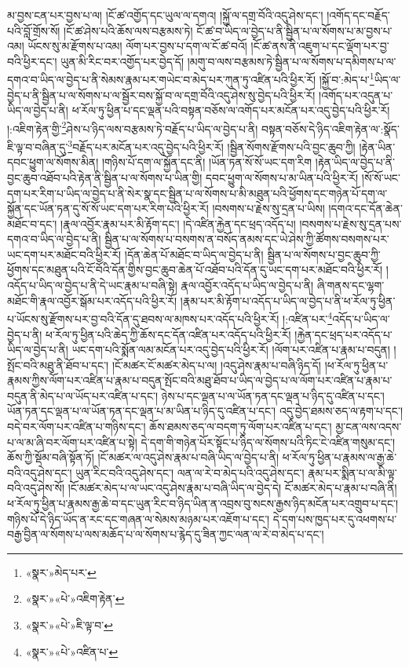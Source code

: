 མ་བྱས་ངན་པར་བྱས་པ་ལ། །ངོ་ཚ་འགྱོད་དང་ཡུལ་ལ་དགའ། །སྐྱོ་ལ་དགྲ་བོའི་འདུ་ཤེས་དང་། །འགོད་དང་བརྗོད་པའི་བློ་གྲོས་སོ། །ངོ་ཚ་ཤེས་པའི་ཆོས་ལས་བརྩམས་ཏེ། ངོ་ཚ་བ་ཡིད་ལ་བྱེད་པ་ནི་སྦྱིན་པ་ལ་སོགས་པ་མ་བྱས་པ་འམ། ཡོངས་སུ་མ་རྫོགས་པ་འམ། ལོག་པར་བྱས་པ་དག་ལ་ངོ་ཚ་བའོ། །ངོ་ཚ་ནས་ནི་འཇུག་པ་དང་ལྡོག་པར་བྱ་བའི་ཕྱིར་དང་། ཡུན་མི་རིང་བར་འགྱོད་པར་བྱེད་དོ། །མགུ་བ་ལས་བརྩམས་ཏེ་སྦྱིན་པ་ལ་སོགས་པ་དམིགས་པ་ལ་དགའ་བ་ཡིད་ལ་བྱེད་པ་ནི་སེམས་རྣམ་པར་གཡེང་བ་མེད་པར་ཀུན་ཏུ་འཛིན་པའི་ཕྱིར་རོ། །སྐྱོ་བ་:མེད་པ་\footnote{«སྣར་»མེད་པར་}ཡིད་ལ་བྱེད་པ་ནི་སྦྱིན་པ་ལ་སོགས་པ་ལ་སྦྱོར་བས་སྐྱོ་བ་ལ་དགྲ་བོའི་འདུ་ཤེས་སུ་བྱེད་པའི་ཕྱིར་རོ། །འགོད་པར་འདུན་པ་ཡིད་ལ་བྱེད་པ་ནི། ཕ་རོལ་ཏུ་ཕྱིན་པ་དང་ལྡན་པའི་བསྟན་བཅོས་ལ་འགོད་པར་མངོན་པར་འདུ་བྱེད་པའི་ཕྱིར་རོ། །:འཇིག་རྟེན་གྱི་\footnote{«སྣར་»«པེ་»འཇིག་རྟེན་}ཤེས་པ་ཉིད་ལས་བརྩམས་ཏེ་བརྗོད་པ་ཡིད་ལ་བྱེད་པ་ནི། བསྟན་བཅོས་དེ་ཉིད་འཇིག་རྟེན་ལ་:སྣོད་ཇི་ལྟ་བ་བཞིན་དུ་\footnote{«སྣར་»«པེ་»ཇི་ལྟ་བ་}བརྗོད་པར་མངོན་པར་འདུ་བྱེད་པའི་ཕྱིར་རོ། །སྦྱིན་སོགས་རྫོགས་པའི་བྱང་ཆུབ་ཀྱི། །རྟེན་ཡིན་དབང་ཕྱུག་ལ་སོགས་མིན། །གཉིས་པོ་དག་ལ་སྐྱོན་དང་ནི། །ཡོན་ཏན་སོ་སོ་ཡང་དག་རིག །རྟེན་ཡིད་ལ་བྱེད་པ་ནི་བྱང་ཆུབ་འཐོབ་པའི་རྟེན་ནི་སྦྱིན་པ་ལ་སོགས་པ་ཡིན་གྱི། དབང་ཕྱུག་ལ་སོགས་པ་མ་ཡིན་པའི་ཕྱིར་རོ། །སོ་སོ་ཡང་དག་པར་རིག་པ་ཡིད་ལ་བྱེད་པ་ནི་སེར་སྣ་དང་སྦྱིན་པ་ལ་སོགས་པ་མི་མཐུན་པའི་ཕྱོགས་དང་གཉེན་པོ་དག་ལ་སྐྱོན་དང་ཡོན་ཏན་དུ་སོ་སོ་ཡང་དག་པར་རིག་པའི་ཕྱིར་རོ། །བསགས་པ་རྗེས་སུ་དྲན་པ་ཡིས། །དགའ་དང་དོན་ཆེན་མཐོང་བ་དང་། །རྣལ་འབྱོར་རྣམ་པར་མི་རྟོག་དང་། །དེ་འཛིན་རྐྱེན་དང་ཕྲད་འདོད་པ། །བསགས་པ་རྗེས་སུ་དྲན་པས་དགའ་བ་ཡིད་ལ་བྱེད་པ་ནི། སྦྱིན་པ་ལ་སོགས་པ་བསགས་ན་བསོད་ནམས་དང་ཡེ་ཤེས་ཀྱི་ཚོགས་བསགས་པར་ཡང་དག་པར་མཐོང་བའི་ཕྱིར་རོ། །དོན་ཆེན་པོ་མཐོང་བ་ཡིད་ལ་བྱེད་པ་ནི། སྦྱིན་པ་ལ་སོགས་པ་བྱང་ཆུབ་ཀྱི་ཕྱོགས་དང་མཐུན་པའི་ངོ་བོའི་དོན་གྱིས་བྱང་ཆུབ་ཆེན་པོ་འཐོབ་པའི་དོན་དུ་ཡང་དག་པར་མཐོང་བའི་ཕྱིར་རོ། །འདོད་པ་ཡིད་ལ་བྱེད་པ་ནི་དེ་ཡང་རྣམ་པ་བཞི་སྟེ། རྣལ་འབྱོར་འདོད་པ་ཡིད་ལ་བྱེད་པ་ནི། ཞི་གནས་དང་ལྷག་མཐོང་གི་རྣལ་འབྱོར་སྒོམ་པར་འདོད་པའི་ཕྱིར་རོ། །རྣམ་པར་མི་རྟོག་པ་འདོད་པ་ཡིད་ལ་བྱེད་པ་ནི་ཕ་རོལ་ཏུ་ཕྱིན་པ་ཡོངས་སུ་རྫོགས་པར་བྱ་བའི་དོན་དུ་ཐབས་ལ་མཁས་པར་འདོད་པའི་ཕྱིར་རོ། །:འཛིན་པར་\footnote{«སྣར་»«པེ་»འཛིན་པ་}འདོད་པ་ཡིད་ལ་བྱེད་པ་ནི། ཕ་རོལ་ཏུ་ཕྱིན་པའི་ཆེད་ཀྱི་ཆོས་དང་དོན་འཛིན་པར་འདོད་པའི་ཕྱིར་རོ། །རྐྱེན་དང་ཕྲད་པར་འདོད་པ་ཡིད་ལ་བྱེད་པ་ནི། ཡང་དག་པའི་སྨོན་ལམ་མངོན་པར་འདུ་བྱེད་པའི་ཕྱིར་རོ། །ལོག་པར་འཛིན་པ་རྣམ་པ་བདུན། །སྤོང་བའི་མཐུ་ནི་ཐོབ་པ་དང་། །ངོ་མཚར་ངོ་མཚར་མེད་པ་ལ། །འདུ་ཤེས་རྣམ་པ་བཞི་ཉིད་དོ། །ཕ་རོལ་ཏུ་ཕྱིན་པ་རྣམས་ཀྱིས་ལོག་པར་འཛིན་པ་རྣམ་པ་བདུན་སྤོང་བའི་མཐུ་ཐོབ་པ་ཡིད་ལ་བྱེད་པ་ལ་ལོག་པར་འཛིན་པ་རྣམ་པ་བདུན་ནི་མེད་པ་ལ་ཡོད་པར་འཛིན་པ་དང་། ཉེས་པ་དང་ལྡན་པ་ལ་ཡོན་ཏན་དང་ལྡན་པ་ཉིད་དུ་འཛིན་པ་དང་། ཡོན་ཏན་དང་ལྡན་པ་ལ་ཡོན་ཏན་དང་ལྡན་པ་མ་ཡིན་པ་ཉིད་དུ་འཛིན་པ་དང་། འདུ་བྱེད་ཐམས་ཅད་ལ་རྟག་པ་དང་། བདེ་བར་ལོག་པར་འཛིན་པ་གཉིས་དང་། ཆོས་ཐམས་ཅད་ལ་བདག་ཏུ་ལོག་པར་འཛིན་པ་དང་། མྱ་ངན་ལས་འདས་པ་ལ་མ་ཞི་བར་ལོག་པར་འཛིན་པ་སྟེ། དེ་དག་གི་གཉེན་པོར་སྟོང་པ་ཉིད་ལ་སོགས་པའི་ཏིང་ངེ་འཛིན་གསུམ་དང་། ཆོས་ཀྱི་སྡོམ་བཞི་སྟོན་ཏོ། །ངོ་མཚར་ལ་འདུ་ཤེས་རྣམ་པ་བཞི་ཡིད་ལ་བྱེད་པ་ནི། ཕ་རོལ་ཏུ་ཕྱིན་པ་རྣམས་ལ་རྒྱ་ཆེ་བའི་འདུ་ཤེས་དང་། ཡུན་རིང་བའི་འདུ་ཤེས་དང་། ལན་ལ་རེ་བ་མེད་པའི་འདུ་ཤེས་དང་། རྣམ་པར་སྨིན་པ་ལ་མི་ལྟ་བའི་འདུ་ཤེས་སོ། །ངོ་མཚར་མེད་པ་ལ་ཡང་འདུ་ཤེས་རྣམ་པ་བཞི་ཡིད་ལ་བྱེད་དེ། ངོ་མཚར་མེད་པ་རྣམ་པ་བཞི་ནི། ཕ་རོལ་ཏུ་ཕྱིན་པ་རྣམས་རྒྱ་ཆེ་བ་དང་ཡུན་རིང་བ་ཉིད་ཡིན་ན་འབྲས་བུ་སངས་རྒྱས་ཉིད་མངོན་པར་འགྲུབ་པ་དང་། གཉིས་པོ་དེ་ཉིད་ཡོད་ན་རང་དང་གཞན་ལ་སེམས་མཉམ་པར་འཇོག་པ་དང་། དེ་དག་པས་ཁྱད་པར་དུ་འཕགས་པ་བརྒྱ་བྱིན་ལ་སོགས་པ་ལས་མཆོད་པ་ལ་སོགས་པ་རྙེད་དུ་ཟིན་ཀྱང་ལན་ལ་རེ་བ་མེད་པ་དང་། 
